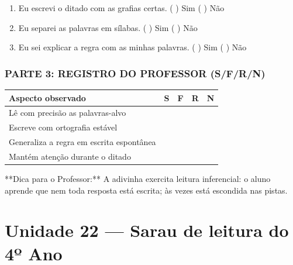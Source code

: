\begin{exercicio}
\begin{enumerate}[label=\alph*)]
  \item Eu escrevi o ditado com as grafias certas.  \quad ( ) Sim   ( ) Não

  \item Eu separei as palavras em sílabas.  \quad ( ) Sim   ( ) Não

  \item Eu sei explicar a regra com as minhas palavras.  \quad ( ) Sim   ( ) Não

\end{enumerate}

\subsection*{PARTE 3: REGISTRO DO PROFESSOR (S/F/R/N)}

\begin{center}
\renewcommand{\arraystretch}{1.4}
\begin{tabular}{@{}p{9cm}cccc@{}}
\toprule
Aspecto observado & S & F & R & N \\
\midrule
Lê com precisão as palavras-alvo & & & & \\
Escreve com ortografia estável & & & & \\
Generaliza a regra em escrita espontânea & & & & \\
Mantém atenção durante o ditado & & & & \\
\bottomrule\end{tabular}\end{center}

\end{exercicio}

\begin{dica}
**Dica para o Professor:** A adivinha exercita leitura inferencial: o aluno aprende que nem toda resposta está escrita; às vezes está escondida nas pistas.
\end{dica}


\chapter{Unidade 22 --- Sarau de leitura do 4º Ano}


